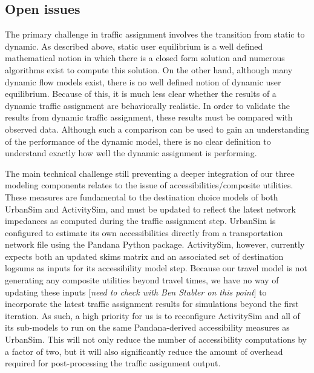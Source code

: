 \subsection{Open issues}

The primary challenge in traffic assignment involves the transition from static to dynamic. As described above, static user equilibrium is a well defined mathematical notion in which there is a closed form solution and numerous algorithms exist to compute this solution. On the other hand, although many dynamic flow models exist, there is no well defined notion of dynamic user equilibrium. Because of this, it is much less clear whether the results of a dynamic traffic assignment are behaviorally realistic. In order to validate the results from dynamic traffic assignment, these results must be compared with observed data. Although such a comparison can be used to gain an understanding of the performance of the dynamic model, there is no clear definition to understand exactly how well the dynamic assignment is performing. 

The main technical challenge still preventing a deeper integration of our three modeling components relates to the issue of accessibilities/composite utilities. These measures are fundamental to the destination choice models of both UrbanSim and ActivitySim, and must be updated to reflect the latest network impedances as computed during the traffic assignment step. UrbanSim is configured to estimate its own accessibilities directly from a transportation network file using the Pandana Python package. ActivitySim, however, currently expects both an updated skims matrix and an associated set of destination logsums as inputs for its accessibility model step. Because our travel model is not generating any composite utilities beyond travel times, we have no way of updating these inputs [\textit{need to check with Ben Stabler on this point}] to incorporate the latest traffic assignment results for simulations beyond the first iteration. As such, a high priority for us is to reconfigure ActivitySim and all of its sub-models to run on the same Pandana-derived accessibility measures as UrbanSim. This will not only reduce the number of accessibility computations by a factor of two, but it will also significantly reduce the amount of overhead required for post-processing the traffic assignment output.


